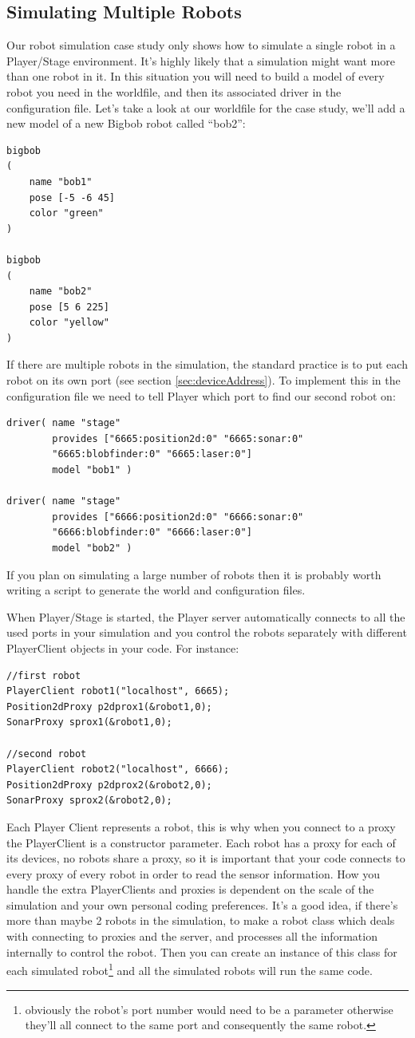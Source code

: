 \documentclass[a4paper]{report}
\newcommand{\plst}{Player/Stage\xspace}
\newcommand{\pl}{Player\xspace}
\begin{document}
\subsection{Simulating Multiple Robots}
Our robot simulation case study only shows how to simulate a single robot in a \plst environment. It's highly likely that a simulation might want more than one robot in it. In this situation you will need to build a model of every robot you need in the worldfile, and then its associated driver in the configuration file. Let's take a look at our worldfile for the case study, we'll add a new model of a new Bigbob robot called ``bob2'':
\begin{verbatim}
bigbob
(
	name "bob1"
	pose [-5 -6 45]
	color "green"
)

bigbob
(
	name "bob2"
	pose [5 6 225]
	color "yellow"
)
\end{verbatim}
If there are multiple robots in the simulation, the standard practice is to put each robot on its own port (see section \ref{sec:deviceAddress}). To implement this in the configuration file we need to tell \pl which port to find our second robot on:
\begin{verbatim}
driver( name "stage" 
        provides ["6665:position2d:0" "6665:sonar:0" 
        "6665:blobfinder:0" "6665:laser:0"] 
        model "bob1" )

driver( name "stage" 
        provides ["6666:position2d:0" "6666:sonar:0" 
        "6666:blobfinder:0" "6666:laser:0"] 
        model "bob2" )
\end{verbatim}
If you plan on simulating a large number of robots then it is probably worth writing a script to generate the world and configuration files.

When \plst is started, the \pl server automatically connects to all the used ports in your simulation and you control the robots separately with different PlayerClient objects in your code. For instance:
\begin{verbatim}
//first robot
PlayerClient robot1("localhost", 6665);
Position2dProxy p2dprox1(&robot1,0);
SonarProxy sprox1(&robot1,0);

//second robot
PlayerClient robot2("localhost", 6666);
Position2dProxy p2dprox2(&robot2,0);
SonarProxy sprox2(&robot2,0);
\end{verbatim}
Each \pl Client represents a robot, this is why when you connect to a proxy the PlayerClient is a constructor parameter. Each robot has a proxy for each of its devices, no robots share a proxy, so it is important that your code connects to every proxy of every robot in order to read the sensor information.
How you handle the extra PlayerClients and proxies is dependent on the scale of the simulation and your own personal coding preferences. It's a good idea, if there's more than maybe 2 robots in the simulation, to make a robot class which deals with connecting to proxies and the server, and processes all the information internally to control the robot. Then you can create an instance of this class for each simulated robot\footnote{obviously the robot's port number would need to be a parameter otherwise they'll all connect to the same port and consequently the same robot.} and all the simulated robots will run the same code.
\end{document}
